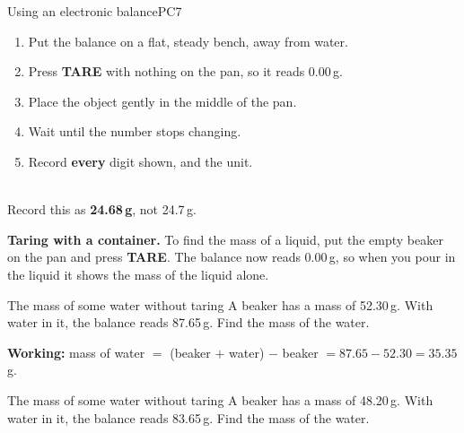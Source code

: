 
\begin{technique}{Using an electronic balance}{PC7}
\begin{minipage}[c]{0.6\linewidth}
\begin{enumerate}[leftmargin=1.6em, itemsep=1pt, topsep=0pt]
  \item Put the balance on a flat, steady bench, away from water.
  \item Press \textbf{TARE} with nothing on the pan, so it reads 0.00\,g.
  \item Place the object gently in the middle of the pan.
  \item Wait until the number stops changing.
  \item Record \textbf{every} digit shown, and the unit.
\end{enumerate}
\end{minipage}\hfill
\begin{minipage}[c]{0.36\linewidth}\centering
{}\\[2pt]
{\footnotesize Record this as \textbf{24.68\,g}, not 24.7\,g.}
\end{minipage}

\medskip
\textbf{Taring with a container.} To find the mass of a liquid, put the empty beaker on the pan and press \textbf{TARE}. The balance now reads 0.00\,g, so when you pour in the liquid it shows the mass of the liquid alone.
\end{technique}

\begin{workedex}{The mass of some water without taring}
A beaker has a mass of 52.30\,g. With water in it, the balance reads 87.65\,g. Find the mass of the water.

\smallskip
\textbf{Working:} mass of water $=$ (beaker $+$ water) $-$ beaker $= 87.65 - 52.30 = 35.35$\,g.
\end{workedex}

\begin{wedo}{The mass of some water without taring}
A beaker has a mass of 48.20\,g. With water in it, the balance reads 83.65\,g. Find the mass of the water.
\workbox{3cm}
\end{wedo}

